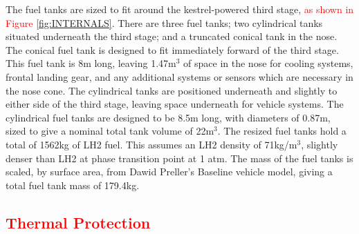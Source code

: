 		

		The fuel tanks are sized to fit around the kestrel-powered third stage, \textcolor{red}{as shown in Figure \ref{fig:INTERNALS}}. There are three fuel tanks; two cylindrical tanks situated underneath the third stage; and a truncated conical tank in the nose. The conical fuel tank is designed to fit immediately forward of the third stage. This fuel tank is 8m long, leaving 1.47m$^3$ of space in the nose for cooling systems, frontal landing gear, and any additional systems or sensors which are necessary in the nose cone. The cylindrical tanks are positioned underneath and slightly to either side of the third stage, leaving space underneath for vehicle systems. The cylindrical fuel tanks are designed to be 8.5m long, with diameters of 0.87m, sized to give a nominal total tank volume of 22m$^3$.
The resized fuel tanks hold a total of 1562kg of LH2 fuel. This assumes an LH2 density of 71kg/m$^3$, slightly denser than LH2 at phase transition point at 1 atm.
The mass of the fuel tanks is scaled, by surface area, from Dawid Preller's Baseline vehicle model\cite{Preller2017b}, giving a total fuel tank mass of 179.4kg.
		
		\textcolor{red}{
			\subsection{Thermal Protection}\label{sec:therm1}
				}
	

